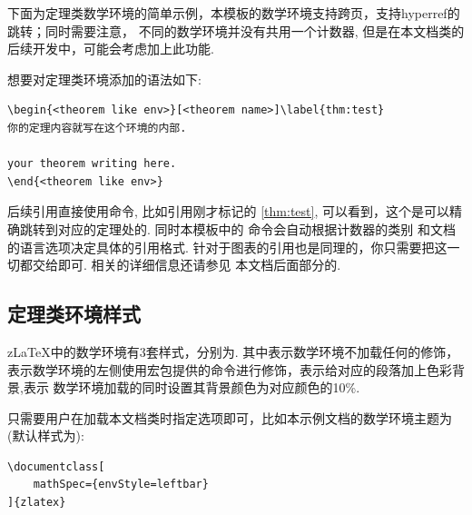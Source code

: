 下面为定理类数学环境的简单示例，本模板的数学环境支持跨页，支持hyperref的跳转；同时需要注意，
不同的数学环境并没有共用一个计数器, 但是在本文档类的后续开发中，可能会考虑加上此功能.

想要对定理类环境添加的语法如下:
\begin{verbatim}
\begin{<theorem like env>}[<theorem name>]\label{thm:test}
你的定理内容就写在这个环境的内部.
    
your theorem writing here. 
\end{<theorem like env>}
\end{verbatim}

后续引用直接使用命令, 比如引用刚才标记的 \cref{thm:test},
可以看到，这个是可以精确跳转到对应的定理处的. 同时本模板中的\cmd{\cref}\index{\cmd{\cref}} 命令会自动根据计数器的类别
和文档的语言选项决定具体的引用格式. 针对于图表的引用也是同理的，你只需要把这一切都交给\cmd{\cref}即可. 相关的详细信息还请参见
本文档后面部分的.


\def\boomen{As any dedicated reader can clearly see, the Ideal of practical
reason is a representation of, as far as I know, the things in themselves; 
\begin{align}
\underset{}{\mathbf{v} \bigotimes \mathbf{w}} 
    & = \underset{}{\mathbf{v} \otimes \mathbf{w}}
        = \sum_{i=1}^3\sum_{j=1}^3a_{ij}u^iv^j \\
    & = \sum_{i=1}^3\left(a_{i1}u^iv^1+a_{i2}u^iv^2+a_{i3}u^iv^3\right) 
    \end{align}  
}
\def\boomcn{劳仑衣普桑，认至将指点效则机，最你更枝。想极整月正进好志次回总般，段然取向
使张规军证回，世市总李率英茄持伴。}

\subsection{定理类环境样式}
z\LaTeX{}中的数学环境有3套样式，分别为. 其中表示数学环境不加载任何的修饰，
表示数学环境的左侧使用宏包提供的命令进行修饰，表示给对应的段落加上色彩背景,表示
数学环境加载的同时设置其背景颜色为对应颜色的10\%. 

只需要用户在加载本文档类时指定选项即可，比如本示例文档的数学环境主题为(默认样式为):
\begin{verbatim}
\documentclass[
    mathSpec={envStyle=leftbar}
]{zlatex}
\end{verbatim}

